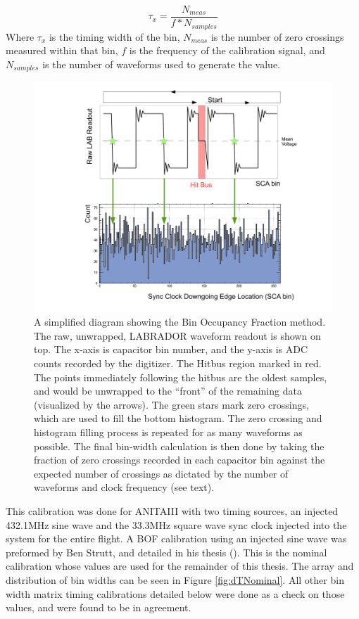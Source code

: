 \begin{equation}
	\tau_{x} = \frac{N_{meas}}{f*N_{samples}}
	\label{eqn:BOF}
\end{equation}
		Where $\tau_{x}$ is the timing width of the bin, $N_{meas}$ is the number of zero crossings measured within that bin, $f$ is the frequency of the calibration signal, and $N_{samples}$ is the number of waveforms used to generate the value.
		
\begin{figure}
	\includegraphics[width=\textwidth]{figures/BOFdiagram}
	\caption{ A simplified diagram showing the Bin Occupancy Fraction method.  The raw, unwrapped, LABRADOR waveform readout is shown on top.  The x-axis is capacitor bin number, and the y-axis is ADC counts recorded by the digitizer. The Hitbus region marked in red. The points immediately following the hitbus are the oldest samples, and would be unwrapped to the ``front'' of the remaining data (visualized by the arrows).  The green stars mark zero crossings, which are used to fill the bottom histogram.  The zero crossing and histogram filling process is repeated for as many waveforms as possible.  The final bin-width calculation is then done by taking the fraction of zero crossings recorded in each capacitor bin against the expected number of crossings as dictated by the number of waveforms and clock frequency (see text). }
	\label{fig:BOFdiagram}
\end{figure}
		
		
		This calibration was done for ANITAIII with two timing sources, an injected 432.1MHz sine wave and the 33.3MHz square wave sync clock injected into the system for the entire flight.  A BOF calibration using an injected sine wave was preformed by Ben Strutt, and detailed in his thesis (\cite{BenSThesis}). This is the nominal calibration whose values are used for the remainder of this thesis.  The array and distribution of bin widths can be seen in Figure \ref{fig:dTNominal}.  All other bin width matrix timing calibrations detailed below were done as a check on those values, and were found to be in agreement.
		
